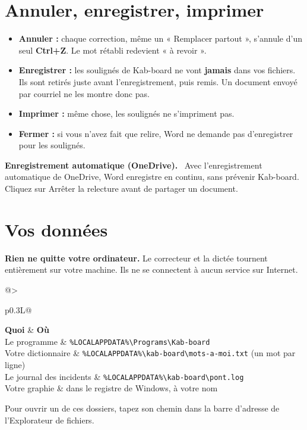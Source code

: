 \documentclass[11pt,a4paper]{article}
\makeatletter
\newcommand{\bouton}[1]{\textsf{#1}}
\newcommand{\chemin}[1]{\texttt{#1}}
\newcommand{\bs}{\textbackslash}
\newenvironment{encadre}[2][]{\par\medskip\noindent\textbf{#2.}\ }{\par\medskip}
\newcommand{\tableau}[3]{%
  \par\noindent\begin{tabularx}{\linewidth}{@{}>{\raggedright\arraybackslash}p{#1}L@{}}
  \toprule #2 \\ \midrule #3 \bottomrule
  \end{tabularx}\par}
\makeatother
\begin{document}
\section{Annuler, enregistrer, imprimer}\label{s:enregistrer}
\begin{itemize}
  \item \textbf{Annuler :} chaque correction, même un « Remplacer partout », s'annule d'un seul \textbf{Ctrl+Z}. Le mot rétabli redevient « à revoir ».
  \item \textbf{Enregistrer :} les soulignés de Kab-board ne vont \textbf{jamais} dans vos fichiers. Ils sont retirés juste avant l'enregistrement, puis remis. Un document envoyé par courriel ne les montre donc pas.
  \item \textbf{Imprimer :} même chose, les soulignés ne s'impriment pas.
  \item \textbf{Fermer :} si vous n'avez fait que relire, Word ne demande pas d'enregistrer pour les soulignés.
\end{itemize}
\begin{encadre}{Enregistrement automatique (OneDrive)}
Avec l'enregistrement automatique de OneDrive, Word enregistre en continu, sans prévenir Kab-board. Cliquez sur \bouton{Arrêter la relecture} avant de partager un document.
\end{encadre}

\section{Vos données}\label{s:donnees}
\textbf{Rien ne quitte votre ordinateur.} Le correcteur et la dictée tournent entièrement sur votre machine. Ils ne se connectent à aucun service sur Internet.

\tableau{0.3\linewidth}{\textbf{Quoi} & \textbf{Où}}{%
Le programme & \chemin{\%LOCALAPPDATA\%\bs Programs\bs Kab-board} \\
Votre dictionnaire & \chemin{\%LOCALAPPDATA\%\bs kab-board\bs mots-a-moi.txt} (un mot par ligne) \\
Le journal des incidents & \chemin{\%LOCALAPPDATA\%\bs kab-board\bs pont.log} \\
Votre graphie & dans le registre de Windows, à votre nom \\}

Pour ouvrir un de ces dossiers, tapez son chemin dans la barre d'adresse de l'Explorateur de fichiers.
\end{document}
